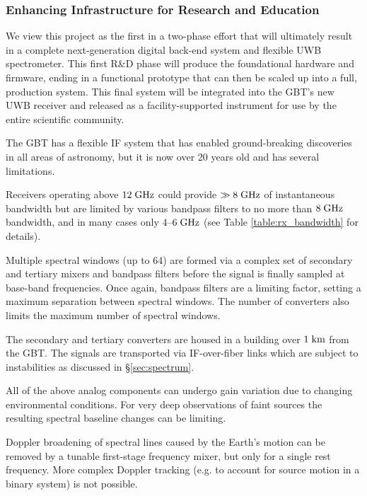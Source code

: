 \documentclass[10pt]{myNSF}
\begin{document}
\subsubsection{Enhancing Infrastructure for Research and Education}
\label{sec:infrastructure}

\label{sec:phase_two}

We view this project as the first in a two-phase effort that will
ultimately result in a complete next-generation digital back-end
system and flexible UWB spectrometer.  This first R\&D phase will produce
the foundational hardware and firmware, ending in a functional
prototype that can then be scaled up into a full, production system.
This final system will be integrated into the GBT's new UWB receiver
and released as a facility-supported instrument for use by the entire
scientific community.

\label{sec:GBT_upgrades}

The GBT has a flexible IF system that has enabled ground-breaking
discoveries in all areas of astronomy, but it is now over 20 years old
and has several limitations.
\begin{itemize*}
\item{Receivers operating above $12\; \textrm{GHz}$ could provide $\gg 8\;
  \textrm{GHz}$ of instantaneous bandwidth but are limited by various bandpass
  filters to no more than $8\; \textrm{GHz}$ bandwidth, and in many cases only
  $4$--$6\; \textrm{GHz}$ (see Table \ref{table:rx_bandwidth} for details).}
\item{Multiple spectral windows (up to 64) are formed via a complex
  set of secondary and tertiary mixers and bandpass filters before the
  signal is finally sampled at base-band frequencies.  Once again,
  bandpass filters are a limiting factor, setting a maximum separation
  between spectral windows.  The number of converters also limits the
  maximum number of spectral windows.}
\item{The secondary and tertiary converters are housed in a building
  over $1\; \textrm{km}$ from the GBT.  The signals are transported via
  IF-over-fiber links which are subject to instabilities as discussed
  in \S\ref{sec:spectrum}.}
\item{All of the above analog components can undergo gain variation
  due to changing environmental conditions.  For very deep
  observations of faint sources the resulting spectral baseline
  changes can be limiting.}
\item{Doppler broadening of spectral lines caused by the Earth's
  motion can be removed by a tunable first-stage frequency mixer, but
  only for a single rest frequency.  More complex Doppler tracking
  (e.g. to account for source motion in a binary system) is not
  possible.}
\end{itemize*}
\end{document}
